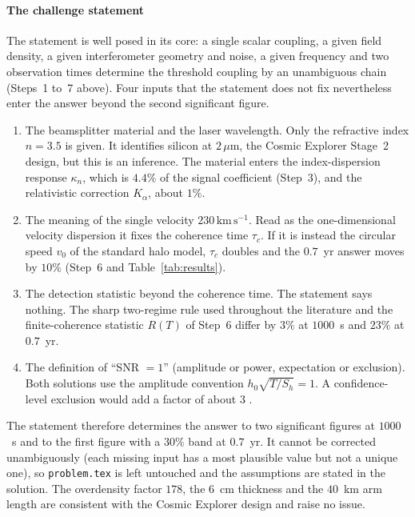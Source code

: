 \paragraph*{The challenge statement}
The statement is well posed in its core: a single scalar coupling, a given field density, a given interferometer geometry and noise, a given frequency and two observation times determine the threshold coupling by an unambiguous chain (Steps~1 to~7 above). Four inputs that the statement does not fix nevertheless enter the answer beyond the second significant figure.
\begin{enumerate}[label=(\roman*),leftmargin=*]
\item The beamsplitter material and the laser wavelength. Only the refractive index $n=3.5$ is given. It identifies silicon at $2\,\mu$m, the Cosmic Explorer Stage~2 design, but this is an inference. The material enters the index-dispersion response $\kappa_n$, which is $4.4\%$ of the signal coefficient (Step~3), and the relativistic correction $K_\alpha$, about $1\%$.
\item The meaning of the single velocity $230\,\mathrm{km\,s^{-1}}$. Read as the one-dimensional velocity dispersion it fixes the coherence time $\tau_c$. If it is instead the circular speed $v_0$ of the standard halo model, $\tau_c$ doubles and the $0.7$~yr answer moves by $10\%$ (Step~6 and Table~\ref{tab:results}).
\item The detection statistic beyond the coherence time. The statement says nothing. The sharp two-regime rule used throughout the literature and the finite-coherence statistic $R(T)$ of Step~6 differ by $3\%$ at $1000$~s and $23\%$ at $0.7$~yr.
\item The definition of ``SNR $=1$'' (amplitude or power, expectation or exclusion). Both solutions use the amplitude convention $h_0\sqrt{T/S_h}=1$. A confidence-level exclusion would add a factor of about $3$ \citep{Centers2021}.
\end{enumerate}
The statement therefore determines the answer to two significant figures at $1000$~s and to the first figure with a $30\%$ band at $0.7$~yr. It cannot be corrected unambiguously (each missing input has a most plausible value but not a unique one), so \texttt{problem.tex} is left untouched and the assumptions are stated in the solution. The overdensity factor $178$, the $6$~cm thickness and the $40$~km arm length are consistent with the Cosmic Explorer design and raise no issue.

